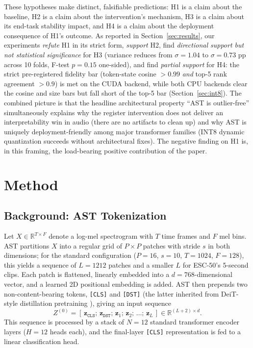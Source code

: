 \documentclass[conference]{IEEEtran}
\begin{document}
These hypotheses make distinct, falsifiable predictions: H1 is a claim about the baseline, H2 is a claim about the intervention's mechanism, H3 is a claim about its end-task stability impact, and H4 is a claim about the deployment consequence of H1's outcome. As reported in Section~\ref{sec:results}, our experiments \emph{refute} H1 in its strict form, \emph{support} H2, find \emph{directional support but not statistical significance} for H3 (variance reduces from $\sigma=1.04$ to $\sigma=0.73$ pp across 10 folds, F-test $p=0.15$ one-sided), and find \emph{partial support} for H4: the strict pre-registered fidelity bar (token-state cosine $>0.99$ \emph{and} top-5 rank agreement $>0.9$) is met on the CUDA backend, while both CPU backends clear the cosine and size bars but fall short of the top-5 bar (Section~\ref{sec:int8}). The combined picture is that the headline architectural property ``AST is outlier-free'' simultaneously explains why the register intervention does not deliver an interpretability win in audio (there are no artifacts to clean up) and why AST is uniquely deployment-friendly among major transformer families (INT8 dynamic quantization succeeds without architectural fixes). The negative finding on H1 is, in this framing, the load-bearing positive contribution of the paper.

\section{Method}

\subsection{Background: AST Tokenization}

Let $X \in \mathbb{R}^{T \times F}$ denote a log-mel spectrogram with $T$ time frames and $F$ mel bins. AST partitions $X$ into a regular grid of $P \times P$ patches with stride $s$ in both dimensions; for the standard configuration ($P=16$, $s=10$, $T=1024$, $F=128$), this yields a sequence of $L = 1212$ patches and a smaller $L$ for ESC-50's 5-second clips. Each patch is flattened, linearly embedded into a $d=768$-dimensional vector, and a learned 2D positional embedding is added. AST then prepends two non-content-bearing tokens, \texttt{[CLS]} and \texttt{[DST]} (the latter inherited from DeiT-style distillation pretraining \cite{touvron2021training}), giving an input sequence
\begin{equation}
Z^{(0)} = [\, \mathbf{z}_{\texttt{CLS}};\, \mathbf{z}_{\texttt{DST}};\, \mathbf{z}_1;\, \mathbf{z}_2;\, \ldots;\, \mathbf{z}_L \,] \in \mathbb{R}^{(L+2) \times d}.
\end{equation}
This sequence is processed by a stack of $N=12$ standard transformer encoder layers ($H=12$ heads each), and the final-layer \texttt{[CLS]} representation is fed to a linear classification head.
\end{document}
